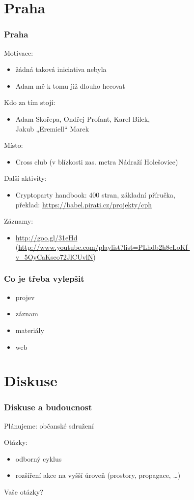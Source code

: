 \documentclass[xetex]{beamer}
\begin{document}
\section{Praha}
\begin{frame}
 \frametitle{Praha}
 Motivace:
 \begin{itemize} 
   \item žádná taková iniciativa nebyla
   \item Adam mě k tomu již dlouho hecovat
 \end{itemize}
 
 Kdo za tím stojí: 
 \begin{itemize}
 \item Adam Skořepa, Ondřej Profant, Karel Bílek,\\ Jakub „Eremiell“ Marek
 \end{itemize}
 
 Místo:
 \begin{itemize}
   \item Cross club (v blízkosti zas. metra Nádraží Holešovice)
 \end{itemize} 
 Další aktivity:
 \begin{itemize}
   \item Cryptoparty handbook: 400 stran, základní příručka,\\
   překlad: \url{https://babel.pirati.cz/projekty/cph}
 \end{itemize} 
 Záznamy:
 \begin{itemize}
	\item \url{http://goo.gl/31eHd}\\
	\scriptsize{(\url{http://www.youtube.com/playlist?list=PLhdb2h8cLoKf-v_5OyCaKseo72JlCUvlN})}
	\end{itemize}
\end{frame}

\begin{frame}
	\frametitle{Co je třeba vylepšit}
	\begin{itemize}
		\item projev
		\item záznam
		\item materiály
		\item web
	\end{itemize}
\end{frame}

\section{Diskuse}
\begin{frame}
	\frametitle{Diskuse a budoucnost}
	Plánujeme: občanské sdružení
	
	Otázky:
	\begin{itemize}
		\item odborný cyklus
		\item rozšíření akce na vyšší úroveň (prostory, propagace, \ldots{})
	\end{itemize}
	
	Vaše otázky?
\end{frame}
\end{document}
